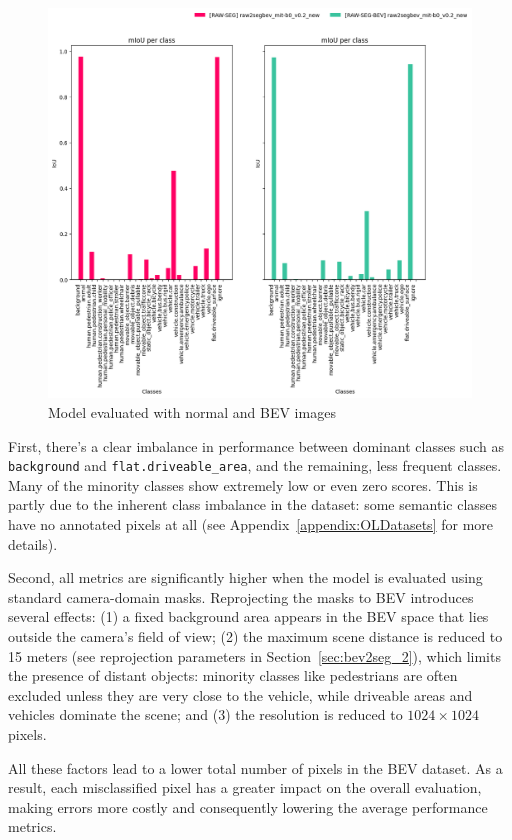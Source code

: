 \begin{figure}[h!]
    \centering
    \includegraphics[width=0.8\linewidth]{./images/experiments/raw2segbev_mit-b0_v0.2_new_test_evaluation.png}
    \caption{Model evaluated with normal and BEV images}
    \label{fig:normal_vs_bev_evaluation}
\end{figure}

First, there's a clear imbalance in performance between dominant classes such as \texttt{background} and \texttt{flat.driveable\_area}, and the remaining, less frequent classes. Many of the minority classes show extremely low or even zero  scores. This is partly due to the inherent class imbalance in the dataset: some semantic classes have no annotated pixels at all (see Appendix~\ref{appendix:OLDatasets} for more details).

Second, all metrics are significantly higher when the model is evaluated using standard camera-domain masks. Reprojecting the masks to BEV introduces several effects: (1) a fixed background area appears in the BEV space that lies outside the camera's field of view; (2) the maximum scene distance is reduced to 15 meters (see reprojection parameters in Section~\ref{sec:bev2seg_2}), which limits the presence of distant objects: minority classes like pedestrians are often excluded unless they are very close to the vehicle, while driveable areas and vehicles dominate the scene; and (3) the resolution is reduced to $1024 \times 1024$ pixels.

All these factors lead to a lower total number of pixels in the BEV dataset. As a result, each misclassified pixel has a greater impact on the overall evaluation, making errors more costly and consequently lowering the average performance metrics.

